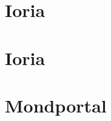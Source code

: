


\chapter[13. November 2016]{Ioria}



\chapter[17. Dezember 2016]{Ioria}



\chapter[14. Januar 2017]{Mondportal}


